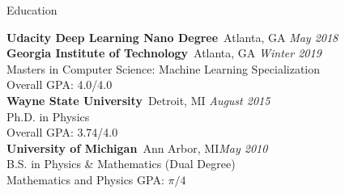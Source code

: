 \documentclass{resume} %
\begin{document}

\begin{rSection}{Education}

\textbf{Udacity Deep Learning Nano Degree}\ Atlanta, GA \hfill {\em May 2018}
\bigskip \\
\textbf{Georgia Institute of Technology}\ Atlanta, GA \hfill {\em Winter 2019} \\ 
Masters in Computer Science: Machine Learning Specialization \smallskip \\
Overall GPA: 4.0/4.0
\bigskip \\
\textbf{Wayne State University}\ Detroit, MI \hfill {\em August 2015} \\ 
Ph.D. in Physics \smallskip \\
Overall GPA: 3.74/4.0
\bigskip \\
\textbf{University of Michigan}\ Ann Arbor, MI\hfill {\em May 2010} \\ 
B.S. in Physics \& Mathematics (Dual Degree)\smallskip \\
Mathematics and Physics GPA: $\pi/4$%

\end{rSection}

\end{document}
